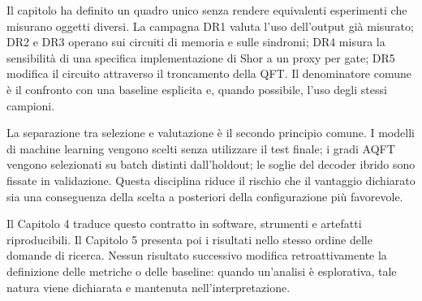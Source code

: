 Il capitolo ha definito un quadro unico senza rendere equivalenti esperimenti che misurano oggetti diversi. La campagna DR1 valuta l'uso dell'output già misurato; DR2 e DR3 operano sui circuiti di memoria e sulle sindromi; DR4 misura la sensibilità di una specifica implementazione di Shor a un proxy per gate; DR5 modifica il circuito attraverso il troncamento della QFT. Il denominatore comune è il confronto con una baseline esplicita e, quando possibile, l'uso degli stessi campioni.

La separazione tra selezione e valutazione è il secondo principio comune. I modelli di machine learning vengono scelti senza utilizzare il test finale; i gradi AQFT vengono selezionati su batch distinti dall'holdout; le soglie del decoder ibrido sono fissate in validazione. Questa disciplina riduce il rischio che il vantaggio dichiarato sia una conseguenza della scelta a posteriori della configurazione più favorevole.

Il Capitolo 4 traduce questo contratto in software, strumenti e artefatti riproducibili. Il Capitolo 5 presenta poi i risultati nello stesso ordine delle domande di ricerca. Nessun risultato successivo modifica retroattivamente la definizione delle metriche o delle baseline: quando un'analisi è esplorativa, tale natura viene dichiarata e mantenuta nell'interpretazione.
